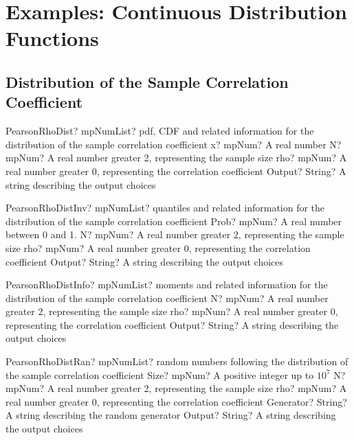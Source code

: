 \documentclass[12pt,a4paper,openany]{book}
\begin{document}
\chapter{Examples: Continuous Distribution Functions}

\section{Distribution of the Sample Correlation Coefficient}

\begin{mpFunctionsExtract}
\mpFunctionFourNotImplemented
{PearsonRhoDist? mpNumList? pdf, CDF and related information for the distribution of the sample correlation coefficient}
{x? mpNum? A real number}
{N? mpNum? A real number greater 2, representing the sample size}
{rho? mpNum? A real number greater 0, representing the correlation coefficient}
{Output? String? A string describing the output choices}
\end{mpFunctionsExtract}

\begin{mpFunctionsExtract}
\mpFunctionFourNotImplemented
{PearsonRhoDistInv? mpNumList? quantiles and related information for the distribution of the sample correlation coefficient}
{Prob? mpNum? A real number between 0 and 1.}
{N? mpNum? A real number greater 2, representing the sample size}
{rho? mpNum? A real number greater 0, representing the correlation coefficient}
{Output? String? A string describing the output choices}
\end{mpFunctionsExtract}

\begin{mpFunctionsExtract}
\mpFunctionThreeNotImplemented
{PearsonRhoDistInfo? mpNumList? moments and related information for the distribution of the sample correlation coefficient}
{N? mpNum? A real number greater 2, representing the sample size}
{rho? mpNum? A real number greater 0, representing the correlation coefficient}
{Output? String? A string describing the output choices}
\end{mpFunctionsExtract}

\begin{mpFunctionsExtract}
\mpFunctionFiveNotImplemented
{PearsonRhoDistRan? mpNumList? random numbers following the distribution of the sample correlation coefficient}
{Size? mpNum? A positive integer up to $10^7$}
{N? mpNum? A real number greater 2, representing the sample size}
{rho? mpNum? A real number greater 0, representing the correlation coefficient}
{Generator? String? A string describing the random generator}
{Output? String? A string describing the output choices}
\end{mpFunctionsExtract}
\end{document}
